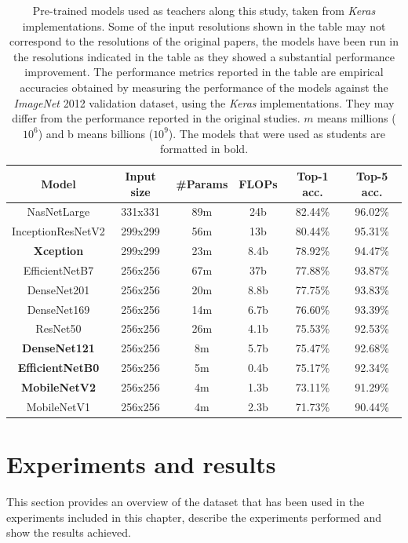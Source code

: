 \begin{table}[h]
	 \small
	 \caption{Pre-trained models used as teachers along this study, taken from \textit{Keras} implementations. Some of the input resolutions shown in the table may not correspond to the resolutions of the original papers, the models have been run in the resolutions indicated in the table as they showed a substantial performance improvement. The performance metrics reported in the table are empirical accuracies obtained by measuring the performance of the models against the \textit{ImageNet} 2012 validation dataset, using the \textit{Keras} implementations. They may differ from the performance reported in the original studies. $m$ means millions ($10^6$) and b means billions ($10^9$). The models that were used as students are formatted in bold.}
	 \centering
 \begin{tabular}{c|ccc|cc}
	 \toprule
			  Model          & Input size & \#Params &  FLOPs  & Top-1 acc. & Top-5 acc. \\ \midrule
		   NasNetLarge       &  331x331   &   89m    &  24b & 82.44\%  &  96.02\%    \\
		InceptionResNetV2    &  299x299   &   56m    & 13b & 80.44\%  &  95.31\%     \\
		\textbf{Xception}    &  299x299   &   23m    &  8.4b & 78.92\%  &  94.47\%     \\
		 EfficientNetB7      &  256x256   &   67m    &  37b & 77.88\%  &  93.87\%     \\
		   DenseNet201       &  256x256   &   20m    &  8.8b & 77.75\%  &  93.83\%     \\
		   DenseNet169       &  256x256   &   14m    & 6.7b & 76.60\%  &  93.39\%     \\
			ResNet50         &  256x256   &   26m    & 4.1b  & 75.53\%  &  92.53\%     \\
	  \textbf{DenseNet121}   &  256x256   &    8m    &  5.7b & 75.47\%  &  92.68\%     \\
	 \textbf{EfficientNetB0} &  256x256   &    5m    & 0.4b & 75.17\%  &  92.34\%     \\
	  \textbf{MobileNetV2}   &  256x256   &    4m    &  1.3b & 73.11\%  &  91.29\%     \\
		   MobileNetV1       &  256x256   &    4m    & 2.3b & 71.73\%  &  90.44\%     \\ \bottomrule
 \end{tabular}
 \label{table:models}
 \end{table}

 \section{Experiments and results} \label{sec:distillation_experiments}
This section provides an overview of the dataset that has been used in the experiments included in this chapter, describe the experiments performed and show the results achieved.

